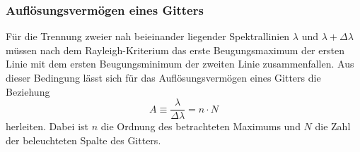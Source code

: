 \documentclass[12pt,a4paper]{article}
\begin{document}
\subsubsection{Auflösungsvermögen eines Gitters}
Für die Trennung zweier nah beieinander liegender Spektrallinien $\lambda$ und $\lambda + \Delta \lambda$ müssen nach dem Rayleigh-Kriterium das erste Beugungsmaximum der ersten Linie mit dem ersten Beugungsminimum der zweiten Linie zusammenfallen. Aus dieser Bedingung lässt sich für das Auflösungsvermögen eines Gitters die Beziehung
\begin{equation}
A \equiv \dfrac{\lambda}{\Delta \lambda} = n \cdot N
\label{eq:AuflösungsvermögenGitterspektrometer}
\end{equation}
herleiten. Dabei ist $n$ die Ordnung des betrachteten Maximums und $N$ die Zahl der beleuchteten Spalte des Gitters.
\end{document}
